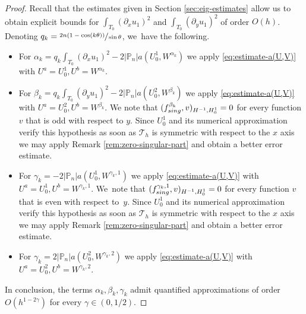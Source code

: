 \documentclass[11pt]{article}
\newcommand{\skpt}{\smallskip}
\numberwithin{equation}{section}\newtheorem*{jepEnonce}{\jepEnonceTitle}\newenvironment{enonce*}[1]{\def\jepEnonceTitle{#1}\jepEnonce}{\endjepEnonce}\newtheorem*{conj*}{Conjecture}
\theoremstyle{plain}
\theoremstyle{definition}
\newcommand{\sing}{\textup{sing}}
\def\Pp{{\mathbb{P}_n}}
\let\jepOriginalSfrac\sfrac
\renewcommand{\sfrac}[2]{{\jepOriginalSfrac{#1}{#2}}}
\begin{document}
\skpt
\begin{proof}
Recall that the estimates given in Section \ref{sec:eig-estimates} allow us to obtain explicit bounds for $\int_{T_0}(\partial_x u_1)^2$ and $\int_{T_0} (\partial_y u_1)^2$ of order $O(h)$. Denoting \hbox{$q_k = \sfrac{2n(1-\cos(k\theta))}{\sin \theta}$}, we~have the following.
\begin{itemize}
\item For $\alpha_k = q_k\int_{T_0}(\partial_x u_1)^2-2|\Pp| a(U_0^1,W^{\alpha_k})$ we apply \eqref{eq:estimate-a(U,V)} with $U^a = U_0^1,U^b = W^{\alpha_k}$.
\item For $\beta_k = q_k\int_{T_0}(\partial_y u_1)^2-2|\Pp| a(U_0^2,W^{\beta_k})$ we apply \eqref{eq:estimate-a(U,V)} with $U^a = U_0^2,U^b = W^{\beta_k}$. We note that $(f_{\sing}^{\beta_k},v)_{H^{-1},H_0^1} = 0$ for every function $v$ that is odd with respect to $y$. Since $U_0^1$ and its numerical approximation verify this hypothesis as soon as $\mathcal T_h$ is symmetric with respect to the $x$ axis we may apply Remark \ref{rem:zero-singular-part} and obtain a better error estimate.
\item For $\gamma_k = -2|\Pp|a(U_0^1,W^{\gamma_k,1})$ we apply \eqref{eq:estimate-a(U,V)} with $U^a = U_0^1, U^b = W^{\gamma_k,1}$. We~note that $(f_{\sing}^{\gamma_k,1},v)_{H^{-1},H_0^1} = 0$ for every function $v$ that is even with respect to~$y$. Since $U_0^1$ and its numerical approximation verify this hypothesis as soon as $\mathcal T_h$ is symmetric with respect to the $x$ axis we may apply Remark \ref{rem:zero-singular-part} and obtain a better error estimate.
\item For $\gamma_k = 2|\Pp| a(U_0^2,W^{\gamma_k,2})$ we apply \eqref{eq:estimate-a(U,V)} with $U^a = U_0^2, U^b = W^{\gamma_k,2}$.
\end{itemize}
In conclusion, the terms $\alpha_k,\beta_k,\gamma_k$ admit quantified approximations of order $O(h^{1-2\gamma})$ for every $\gamma \in (0,1/2)$.
\end{proof}
\end{document}
